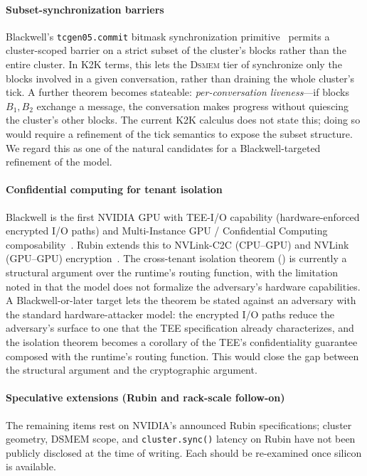 \paragraph{Subset-synchronization barriers}
Blackwell's \texttt{tcgen05.commit} bitmask synchronization
primitive~\citep{colfax2024clusters} permits a cluster-scoped
barrier on a strict subset of the cluster's blocks rather than the
entire cluster.  In K2K terms, this lets the
\textsc{Dsmem} tier of  synchronize only the
blocks involved in a given conversation, rather than draining the
whole cluster's tick.  A further theorem becomes stateable:
\emph{per-conversation liveness}—if blocks $B_1, B_2$ exchange a
message, the conversation makes progress without quiescing the
cluster's other blocks.  The current K2K calculus does not state
this; doing so would require a refinement of the tick semantics
to expose the subset structure.  We regard this as one of the
natural candidates for a Blackwell-targeted refinement of the
model.

\paragraph{Confidential computing for tenant isolation}
Blackwell is the first NVIDIA GPU with TEE-I/O capability
(hardware-enforced encrypted I/O paths) and Multi-Instance GPU /
Confidential Computing
composability~\citep{nvidia2024secureai}.  Rubin
extends this to NVLink-C2C (CPU--GPU) and NVLink (GPU--GPU)
encryption~\citep{nvidia2025rubin}.  The cross-tenant isolation
theorem () is currently a
structural argument over the runtime's routing function, with the
limitation noted in  that the model does
not formalize the adversary's hardware capabilities.  A
Blackwell-or-later target lets the theorem be stated against an
adversary with the standard hardware-attacker model: the
encrypted I/O paths reduce the adversary's surface to one that the
TEE specification already characterizes, and the isolation theorem
becomes a corollary of the TEE's confidentiality guarantee
composed with the runtime's routing function.  This would close
the gap between the structural argument and the cryptographic
argument.

\paragraph{Speculative extensions (Rubin and rack-scale follow-on)}
The remaining items rest on NVIDIA's announced Rubin
specifications; cluster geometry, DSMEM scope, and
\texttt{cluster.sync()} latency on Rubin have not been publicly
disclosed at the time of writing.  Each should be re-examined once
silicon is available.

